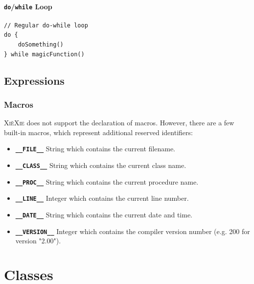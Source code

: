 \documentclass[a5paper]{report}
\def\xiexie{\textsc{Xi\`eXie}\xspace}
\begin{document}
\subsubsection{\texttt{do}/\texttt{while} Loop}

\begin{lstlisting}
// Regular do-while loop
do {
    doSomething()
} while magicFunction()
\end{lstlisting}



\section{Expressions}

\subsection{Macros}

\xiexie does not support the declaration of macros. However, there are a few built-in macros, which represent additional
reserved identifiers:
\begin{itemize}
	\item \textbf{\texttt{\_\_FILE\_\_}} String which contains the current filename.
	\item \textbf{\texttt{\_\_CLASS\_\_}} String which contains the current class name.
	\item \textbf{\texttt{\_\_PROC\_\_}} String which contains the current procedure name.
	\item \textbf{\texttt{\_\_LINE\_\_}} Integer which contains the current line number.
	\item \textbf{\texttt{\_\_DATE\_\_}} String which contains the current date and time.
	\item \textbf{\texttt{\_\_VERSION\_\_}} Integer which contains the compiler version number (e.g. 200 for version "2.00").
\end{itemize}



\chapter{Classes}
\label{ch:classes}
\end{document}
